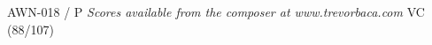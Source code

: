 \documentclass[11pt]{report}
\begin{document}
\null \vfill

AWN-018 / P \hfill
\textit{Scores available from the composer at www.trevorbaca.com}
\hfill VC (88/107)
\end{document}
